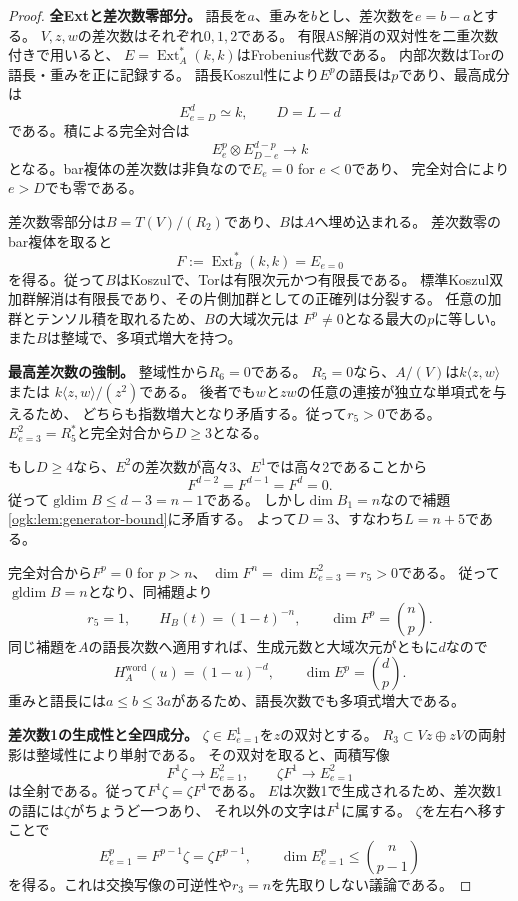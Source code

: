 \documentclass[11pt,a4paper]{ltjsarticle}
\theoremstyle{definition}
\begin{document}
\begin{proof}
\par\smallskip\noindent\textbf{全Extと差次数零部分。}\quad
語長を$a$、重みを$b$とし、差次数を$e=b-a$とする。
$V,z,w$の差次数はそれぞれ$0,1,2$である。
有限AS解消の双対性を二重次数付きで用いると、
$E=\operatorname{Ext}_A^*(k,k)$はFrobenius代数である。
内部次数はTorの語長・重みを正に記録する。
語長Koszul性により$E^p$の語長は$p$であり、最高成分は
\[
E^d_{e=D}\simeq k,\qquad D=L-d
\]
である。積による完全対合は
\[
E^p_e\otimes E^{d-p}_{D-e}\longrightarrow k
\]
となる。bar複体の差次数は非負なので$E_e=0$ for $e<0$であり、
完全対合により$e>D$でも零である。

差次数零部分は$B=T(V)/(R_2)$であり、$B$は$A$へ埋め込まれる。
差次数零のbar複体を取ると
\[
F:=\operatorname{Ext}_B^*(k,k)=E_{e=0}
\]
を得る。従って$B$はKoszulで、Torは有限次元かつ有限長である。
標準Koszul双加群解消は有限長であり、その片側加群としての正確列は分裂する。
任意の加群とテンソル積を取れるため、$B$の大域次元は
$F^p\ne0$となる最大の$p$に等しい。
また$B$は整域で、多項式増大を持つ。

\par\smallskip\noindent\textbf{最高差次数の強制。}\quad
整域性から$R_6=0$である。
$R_5=0$なら、$A/(V)$は$k\langle z,w\rangle$または
$k\langle z,w\rangle/(z^2)$である。
後者でも$w$と$zw$の任意の連接が独立な単項式を与えるため、
どちらも指数増大となり矛盾する。従って$r_5>0$である。
$E^2_{e=3}=R_5^*$と完全対合から$D\geq3$となる。

もし$D\geq4$なら、$E^2$の差次数が高々3、$E^1$では高々2であることから
\[
F^{d-2}=F^{d-1}=F^d=0.
\]
従って$\operatorname{gldim}B\leq d-3=n-1$である。
しかし$\dim B_1=n$なので補題\ref{ogk:lem:generator-bound}に矛盾する。
よって$D=3$、すなわち$L=n+5$である。

完全対合から$F^p=0$ for $p>n$、
$\dim F^n=\dim E^2_{e=3}=r_5>0$である。
従って$\operatorname{gldim}B=n$となり、同補題より
\[
r_5=1,\qquad H_B(t)=(1-t)^{-n},\qquad\dim F^p=\binom np.
\]
同じ補題を$A$の語長次数へ適用すれば、生成元数と大域次元がともに$d$なので
\[
H_A^{\mathrm{word}}(u)=(1-u)^{-d},\qquad\dim E^p=\binom dp.
\]
重みと語長には$a\leq b\leq3a$があるため、語長次数でも多項式増大である。

\par\smallskip\noindent\textbf{差次数1の生成性と全四成分。}\quad
$\zeta\in E^1_{e=1}$を$z$の双対とする。
$R_3\subset Vz\oplus zV$の両射影は整域性により単射である。
その双対を取ると、両積写像
\[
F^1\zeta\longrightarrow E^2_{e=1},\qquad
\zeta F^1\longrightarrow E^2_{e=1}
\]
は全射である。従って$F^1\zeta=\zeta F^1$である。
$E$は次数1で生成されるため、差次数1の語には$\zeta$がちょうど一つあり、
それ以外の文字は$F^1$に属する。
$\zeta$を左右へ移すことで
\[
E^p_{e=1}=F^{p-1}\zeta=\zeta F^{p-1},\qquad
\dim E^p_{e=1}\leq\binom n{p-1}
\]
を得る。これは交換写像の可逆性や$r_3=n$を先取りしない議論である。


\end{proof}
\end{document}
